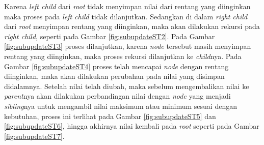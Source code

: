 \quad Karena \textit{left child} dari \textit{root} tidak menyimpan nilai dari rentang yang diinginkan maka proses pada \textit{left child} tidak dilanjutkan. Sedangkan di dalam \textit{right child} dari \textit{root} menyimpan rentang yang diinginkan, maka akan dilakukan rekursi pada \textit{right child}, seperti pada Gambar \ref{fig:subupdateST2}. Pada Gambar \ref{fig:subupdateST3} proses dilanjutkan, karena \textit{node} tersebut masih menyimpan rentang yang diinginkan, maka proses rekursi dilanjutkan ke \textit{child}nya. Pada Gambar \ref{fig:subupdateST4} proses telah mencapai \textit{node} dengan rentang diinginkan, maka akan dilakukan perubahan pada nilai yang disimpan didalamnya. \newpage
\quad Setelah nilai telah diubah, maka sebelum mengembalikan nilai ke \textit{parent}nya akan dilakukan perbandingan nilai dengan \textit{node} yang menjadi \textit{sibling}nya untuk mengambil nilai maksimum atau minimum sesuai dengan kebutuhan, proses ini terlihat pada Gambar \ref{fig:subupdateST5} dan \ref{fig:subupdateST6}, hingga akhirnya nilai kembali pada \textit{root} seperti pada Gambar \ref{fig:subupdateST7}.
